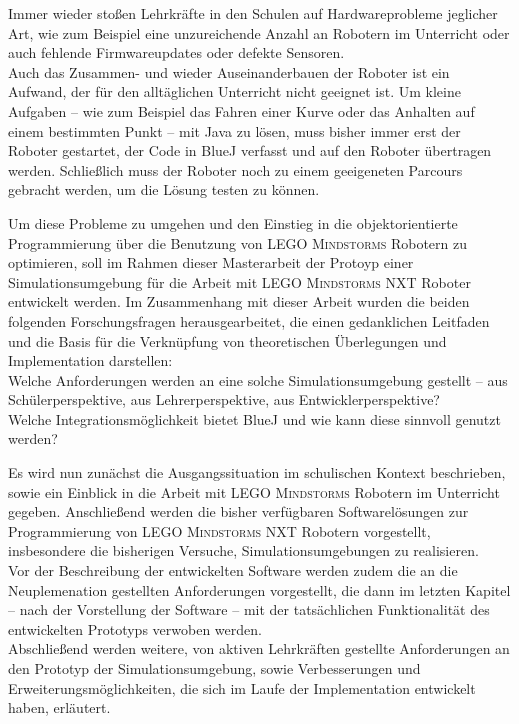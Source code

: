 \documentclass[paper=a4, DIV=calc, BCOR=12mm, twoside=on, onecolumn=on, open = right, titlepage =on, parskip =half-, headsepline = on, footsepline = off, chapterprefix = off, appendixprefix = on, fontsize = 12pt, numbers = noenddot, abstract = on]{scrbook}
\begin{document}
Immer wieder stoßen Lehrkräfte in den Schulen auf Hardwareprobleme jeglicher Art, wie zum Beispiel eine unzureichende Anzahl an Robotern im Unterricht oder auch fehlende Firmwareupdates oder defekte Sensoren.\\
Auch das Zusammen- und wieder Auseinanderbauen der Roboter ist ein Aufwand, der für den alltäglichen Unterricht nicht geeignet ist. Um kleine Aufgaben -- wie zum Beispiel das Fahren einer Kurve oder das Anhalten auf einem bestimmten Punkt -- mit Java zu lösen, muss bisher immer erst der Roboter gestartet, der Code in BlueJ verfasst und auf den Roboter übertragen werden. Schließlich muss der Roboter noch zu einem geeigeneten Parcours gebracht werden, um die Lösung testen zu können.

Um diese Probleme zu umgehen und den Einstieg in die objektorientierte Programmierung über die Benutzung von \textsc{LEGO Mindstorms} Robotern zu optimieren, soll im Rahmen dieser Masterarbeit der Protoyp einer Simulationsumgebung für die Arbeit mit \textsc{LEGO Mindstorms} NXT Roboter entwickelt werden. Im Zusammenhang mit dieser Arbeit wurden die beiden folgenden Forschungsfragen herausgearbeitet, die einen gedanklichen Leitfaden und die Basis für die Verknüpfung von theoretischen Überlegungen und Implementation darstellen:\\
Welche Anforderungen werden an eine solche Simulationsumgebung gestellt -- aus Schülerperspektive, aus Lehrerperspektive, aus Entwicklerperspektive?\\
Welche Integrationsmöglichkeit bietet BlueJ und wie kann diese sinnvoll genutzt werden?

Es wird nun zunächst die Ausgangssituation im schulischen Kontext beschrieben, sowie ein Einblick in die Arbeit mit \textsc{LEGO Mindstorms} Robotern im Unterricht gegeben. Anschließend werden die bisher verfügbaren Softwarelösungen zur Programmierung von \textsc{LEGO Mindstorms} NXT Robotern vorgestellt, insbesondere die bisherigen Versuche, Simulationsumgebungen zu realisieren.\\
Vor der Beschreibung der entwickelten Software werden zudem die an die Neuplemenation gestellten Anforderungen vorgestellt, die dann im letzten Kapitel -- nach der Vorstellung der Software -- mit der tatsächlichen Funktionalität des entwickelten Prototyps verwoben werden.\\
Abschließend werden weitere, von aktiven Lehrkräften gestellte Anforderungen an den Prototyp der Simulationsumgebung, sowie Verbesserungen und Erweiterungsmöglichkeiten, die sich im Laufe der Implementation entwickelt haben, erläutert.
\newpage
\par\singlespacing
\end{document}
